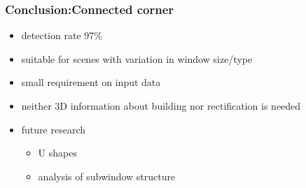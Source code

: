 \documentclass{beamer}
\begin{document}
\frame
{
}


\frame
{
	\frametitle{Conclusion:Connected corner}
	\begin{itemize}
	\item <+-| alert@+> detection rate 97\%
	\item <+-| alert@+> suitable for scenes with variation in window size/type
	\item <+-| alert@+> small requirement on input data
		\item <+-| alert@+> neither 3D information about building nor rectification is needed
	\item <+-| alert@+> future research
		\begin{itemize}			
		\item <+-| alert@+> U shapes 
		\item <+-| alert@+> analysis of subwindow structure
		\end{itemize}			
	\end{itemize}
}
\end{document}
